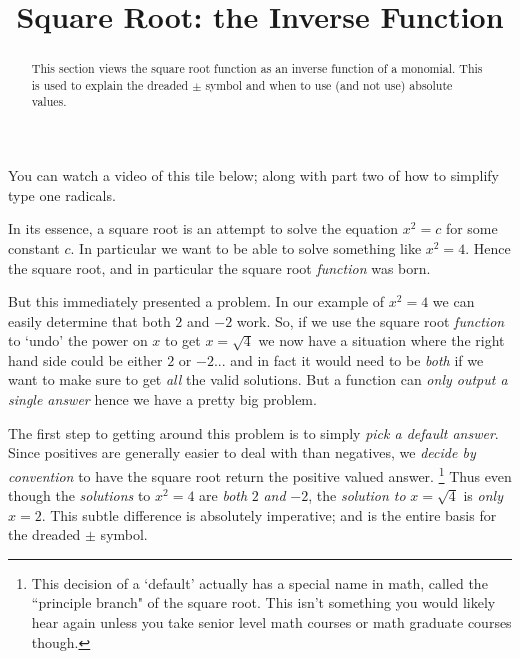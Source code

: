 \documentclass{ximera}
\title{Square Root: the Inverse Function}
\begin{document}
\begin{abstract}
This section views the square root function as an inverse function of a monomial. This is used to explain the dreaded $\pm$ symbol and when to use (and not use) absolute values.
\end{abstract}
\maketitle

You can watch a video of this tile below; along with part two of how to simplify type one radicals.


In its essence, a square root is an attempt to solve the equation $x^2 = c$ for some constant $c$. In particular we want to be able to solve something like $x^2 = 4$. %
Hence the square root, and in particular the square root \textit{function} was born.

But this immediately presented a problem. In our example of $x^2 = 4$ we can easily determine that both $2$ and $-2$ work. So, if we use the square root \textit{function} to `undo' the power on $x$ to get $x = \sqrt{4}$ we now have a situation where the right hand side could be either $2$ or $-2$... and in fact it would need to be \textit{both} if we want to make sure to get \textit{all} the valid solutions. But a function can \textit{only output a single answer} hence we have a pretty big problem.

The first step to getting around this problem is to simply \textit{pick a default answer}. Since positives are generally easier to deal with than negatives, we \textit{decide by convention} to have the square root return the positive valued answer.%
\footnote{%
    This decision of a `default' actually has a special name in math, called the ``principle branch" of the square root. This isn't something you would likely hear again unless you take senior level math courses or math graduate courses though.%
    }
Thus even though the \textit{solutions} to $x^2 = 4$ are \textit{both} $2$ \textit{and} $-2$, the \textit{solution to} $x = \sqrt{4}$ is \textit{only} $x = 2$. This subtle difference is absolutely imperative; and is the entire basis for the dreaded $\pm$ symbol.
\end{document}

